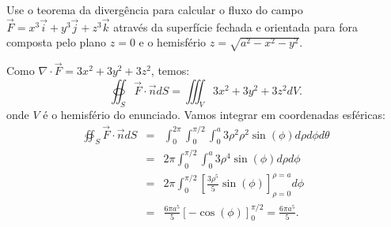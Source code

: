 \begin{exeresol} Use o teorema da divergência para calcular o fluxo do campo $\vec{F}=x^3\vec{i}+y^3\vec{j}+z^3\vec{k}$ através da superfície fechada e orientada para fora composta pelo plano $z=0$ e o hemisfério  $z=\sqrt{a^2-x^2-y^2}$.
\end{exeresol}
\begin{resol}
Como $\nabla\cdot \vec{F}=3x^2+3y^2+3z^2$, temos: 
$$
\oiint_S \vec{F}\cdot \vec{n} dS=\iiint_V 3x^2+3y^2+3z^2 dV.
$$
onde $V$ é o hemisfério do enunciado. Vamos integrar em coordenadas esféricas:
\begin{eqnarray*}
\oiint_S \vec{F}\cdot \vec{n} dS&=&\int_0^{2\pi} \int_0^{\pi/2} \int_0^a 3\rho^2 \rho^2\sin(\phi)d\rho d\phi d\theta\\
&=&2\pi \int_0^{\pi/2} \int_0^a 3\rho^4\sin(\phi)d\rho d\phi \\
&=&2\pi \int_0^{\pi/2} \left[ \frac{3\rho^5}{5}\sin(\phi)\right]_{\rho=0}^{\rho=a} d\phi \\
&=&\frac{6\pi a^5}{5} \left[ -\cos(\phi)\right]_0^{\pi/2}=\frac{6\pi a^5}{5}. 
\end{eqnarray*}
\end{resol}


